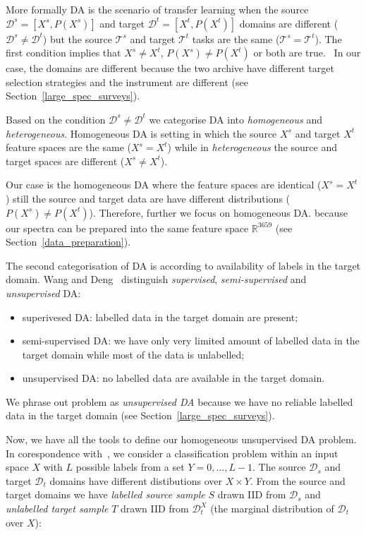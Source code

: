 More formally DA is the scenario of transfer learning
when the source \(\mathcal{D}^s = [X^s, P(X^s)]\)
and target \(\mathcal{D}^t = [X^t, P(X^t)]\) domains
are different (\(\mathcal{D}^s \ne \mathcal{D}^t\))
but the source \(\mathcal{T}^s\) and target \(\mathcal{T}^t\)
tasks are the same (\(\mathcal{T}^s = \mathcal{T}^t\)).
The first condition implies
that \(X^s \ne X^t\), \(P(X^s) \ne P(X^t)\) or both are true.~\cite{pan2010}
In our case, the domains are different
because the two archive have different target selection strategies
and the instrument are different (see Section~\ref{large_spec_surveys}).

Based on the condition \(\mathcal{D}^s \ne \mathcal{D}^t\)
we categorise DA into \textit{homogeneous} and \textit{heterogeneous}.
Homogeneous DA is setting in which the source \(X^s\)
and target \(X^t\) feature spaces are the same (\(X^s = X^t\))
while in \textit{heterogeneous} the source and target spaces are different
(\(X^s \ne X^t\)).~\cite{csurka2017}

Our case is the homogeneous DA
where the feature spaces are identical (\(X^s = X^t\))
still the source and target data are have different distributions (\(P(X^s) \ne P(X^t)\)).
Therefore, further we focus on homogeneous DA.
because our spectra can be prepared into the same feature space \(\mathbb{R}^{3659}\)
(see Section~\ref{data_preparation}).

The second categorisation of DA is according to availability of labels in the target domain.
Wang and Deng~\cite{wang2018} distinguish \textit{supervised}, \textit{semi-supervised} and \textit{unsupervised} DA:

\begin{itemize}
	\item superivesed DA: labelled data in the target domain are present;
	\item semi-supervised DA: we have only very limited amount of labelled data in the target domain while most of the data is unlabelled;
	\item unsupervised DA: no labelled data are available in the target domain.
\end{itemize}

We phrase out problem as \textit{unsupervised DA}
because we have no reliable labelled data in the target domain
(see Section~\ref{large_spec_surveys}).

Now, we have all the tools to define our homogeneous unsupervised DA problem.
In corespondence with~\cite{ganin2016},
we consider a classification problem within an input space \(X\)
with \(L\) possible labels from a set \(Y = {0, \dots, L - 1}\).
The source \(\mathcal{D}_s\) and target \(\mathcal{D}_t\) domains
have different distibutions over \(X \times Y\).
From the source and target domains
we have \textit{labelled source sample} \(S\) drawn IID from \(\mathcal{D}_s\)
and \textit{unlabelled target sample} \(T\) drawn IID from \(\mathcal{D}^X_t\) 
(the marginal distribution of \(\mathcal{D}_t\) over \(X\)):

